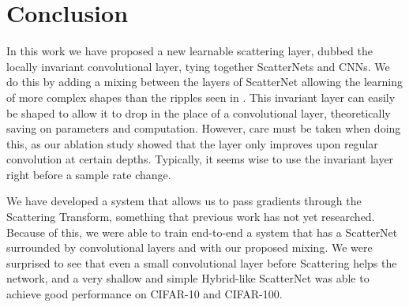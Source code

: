 \section{Conclusion}\label{sec:conclusion}
In this work we have proposed a new learnable scattering layer, dubbed the
locally invariant convolutional layer, tying together ScatterNets and CNNs.
We do this by adding a mixing between the layers of ScatterNet allowing the
learning of more complex shapes than the ripples seen in
\cite{cotter_visualizing_2017}. This invariant layer can easily be shaped to allow
it to drop in the place of a convolutional layer, theoretically saving on parameters and
computation. However, care must be taken when doing this, as our ablation study
showed that the layer only improves upon regular convolution at certain depths.
Typically, it seems wise to use the invariant layer right before a sample rate
change.

We have developed a system that allows us to pass
gradients through the Scattering Transform, something that previous work has not
yet researched. Because of this, we were able to train end-to-end a system that
has a ScatterNet surrounded by convolutional layers and with our proposed mixing. 
We were surprised to see that even a small
convolutional layer before Scattering helps the network, and a
very shallow and simple Hybrid-like ScatterNet was able to achieve good
performance on CIFAR-10 and CIFAR-100.


